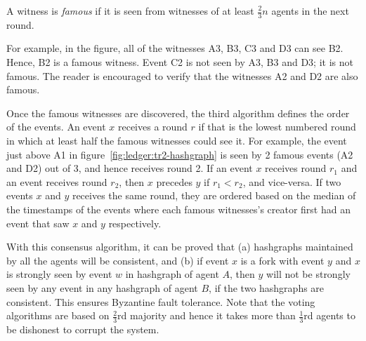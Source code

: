 \begin{definition}
	A witness is {\em famous} if it is seen from witnesses of at least $\frac{2}{3}n$ agents in the next round.
\end{definition}

\noindent
For example, in the figure, all of the witnesses A3, B3, C3 and D3 can see B2. Hence, B2 is a famous witness. Event C2 is not seen by 
A3, B3 and D3; it is not famous. The reader is encouraged to verify that the witnesses A2 and D2 are also famous.

Once the famous witnesses are discovered, the third algorithm defines the order of the events. An event $x$ receives a round
$r$ if that is the lowest numbered round in which at least half the famous witnesses could see it. For example, the event just above
A1 in figure~\ref{fig:ledger:tr2-hashgraph} is seen by 2 famous events (A2 and D2) out of 3, and hence receives round 2. If an 
event $x$ receives round $r_1$ and an event receives round $r_2$, then $x$ precedes $y$ if $r_1 < r_2$, and vice-versa. If two events 
$x$ and $y$ receives the same round, they are ordered based on the median of the timestamps of the events where each famous witnesses’s 
creator first had an event that saw $x$ and $y$ respectively.

With this consensus algorithm, it can be proved that (a) hashgraphs maintained by all the agents will be consistent, and (b) if event 
$x$ is a fork with event $y$ and $x$ is strongly seen by event $w$ in hashgraph of agent $A$, then $y$ will not be strongly seen by any 
event in any hashgraph of agent $B$, if the two hashgraphs are consistent. This ensures Byzantine fault tolerance. Note that the voting 
algorithms are based on $\frac{2}{3}$rd majority and hence it takes more than $\frac{1}{3}$rd agents to be dishonest to corrupt the system.


